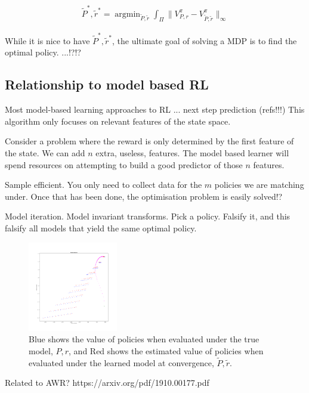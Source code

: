 \begin{align}
\tilde P^{* }, \tilde r^{* } = \mathop{\text{argmin}}_{\tilde P, \tilde r} \int_{\Pi} \parallel V^{\pi}_{P, r} -V^{\pi}_{\tilde P, \tilde r} \parallel_\infty
\end{align}

While it is nice to have $\tilde P^{* }, \tilde r^{* }$, the ultimate goal of
solving a MDP is to find the optimal policy. ...!?!?

\subsection{Relationship to model based RL}

Most model-based learning approaches to RL ... next step prediction (refs!!!)
This algorithm only focuses on relevant features of the state space.

Consider a problem where the reward is only determined by the first feature of the state. We can add $n$ extra, useless, features.
The model based learner will spend resources on attempting to build a good predictor of those $n$ features.

Sample efficient. You only need to collect data for the $m$ policies we are matching under.
Once that has been done, the optimisation problem is easily solved!?

Model iteration. Model invariant transforms. Pick a policy. Falsify it,
and this falsify all models that yield the same optimal policy.

\begin{figure}[!h]
\centering
\includegraphics[width=0.35\textwidth,height=0.35\textheight]{../../pictures/figures/model_iteration.png}
\caption{Blue shows the value of policies when evaluated under the true model, $P, r$,
and Red shows the estimated value of policies when evaluated under the learned model at convergence, $\tilde P, \tilde r$.}
\end{figure}


Related to AWR? https://arxiv.org/pdf/1910.00177.pdf



